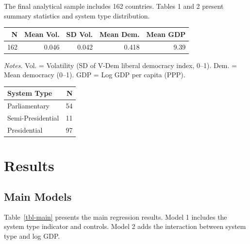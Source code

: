 \documentclass[
  letterpaper,
  DIV=11,
  numbers=noendperiod]{scrartcl}
\begin{document}
The final analytical sample includes 162 countries. Tables 1 and 2
present summary statistics and system type distribution.

\begin{table}[!htbp]
\begin{minipage}{.5\linewidth}
\centering
{}

\begin{tabular}{rrrrr}
\toprule
N & Mean Vol. & SD Vol. & Mean Dem. & Mean GDP\\
\midrule
162 & 0.046 & 0.042 & 0.418 & 9.39\\
\bottomrule
\end{tabular}
\vspace{1mm}\par\scriptsize\textit{Notes.} Vol. = Volatility (SD of V-Dem liberal democracy index, 0--1). Dem. = Mean democracy (0--1). GDP = Log GDP per capita (PPP).
\end{minipage}%
\begin{minipage}{.5\linewidth}
\centering
{}

\begin{tabular}{lr}
\toprule
System Type & N\\
\midrule
Parliamentary & 54\\
Semi-Presidential & 11\\
Presidential & 97\\
\bottomrule
\end{tabular}
\end{minipage}
\end{table}

\section{Results}\label{sec-results}

\subsection{Main Models}\label{main-models}

Table~\ref{tbl-main} presents the main regression results. Model 1
includes the system type indicator and controls. Model 2 adds the
interaction between system type and log GDP.
\end{document}
